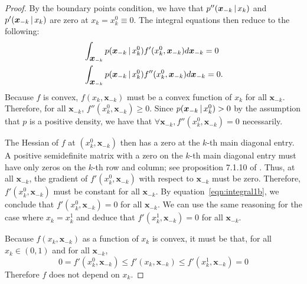 \begin{proof}
By the boundary points condition, we have that $p''(\mbox{\boldmath $x$}_{-k}
{\,|\,} x_k)$ and $p'(\mbox{\boldmath $x$}_{-k} {\,|\,} x_k)$ are zero at $x_k =
x_k^0 \equiv 0$. The integral equations then reduce to the following:
\begin{align}
& \int_{\mbox{\boldmath $x$}_{-k}} p(\mbox{\boldmath $x$}_{-k} {\,|\,} x^0_k) f'(x^0_k, \mbox{\boldmath $x$}_{-k}) d \mbox{\boldmath $x$}_{-k}= 0 \label{eqn:integral1b} \\
& \int_{\mbox{\boldmath $x$}_{-k}} p(\mbox{\boldmath $x$}_{-k} {\,|\,} x^0_k) f''(x^0_k, \mbox{\boldmath $x$}_{-k}) d\mbox{\boldmath $x$}_{-k} = 0.
\end{align}
Because $f$ is convex, $f(x_k, \mathbf{x}_{-k})$ must be a convex
function of 
$x_k$ for all $\mathbf{x}_{-k}$. Therefore, for all $\mathbf{x}_{-k}$,
$f''(x^0_k, \mathbf{x}_{-k}) \geq 0$. Since $p(\mbox{\boldmath $x$}_{-k} {\,|\,}
x^0_k) > 0$ by the assumption that $p$ is a positive density, 
we have that $\forall \mathbf{x}_{-k}, f''(x^0_k, \mathbf{x}_{-k}) = 0$ necessarily.

The Hessian of $f$ at $(x^0_k, \mathbf{x}_{-k})$ then has a zero at
the $k$-th main diagonal entry. A positive semidefinite matrix with a
zero on the $k$-th main diagonal entry must have only zeros on the
$k$-th row and column; see proposition 7.1.10 of
\citet{HJ90}.  Thus, at all $\mathbf{x}_{-k}$, the
gradient of $f'(x^0_k, \mathbf{x}_{-k})$ with respect to
$\mathbf{x}_{-k}$ must be zero.
Therefore, $f'(x_k^0, \mathbf{x}_{-k})$ must be constant for all
$\mathbf{x}_{-k}$. By equation~\ref{eqn:integral1b}, we conclude 
that $f'(x_k^0, \mathbf{x}_{-k}) = 0$ for all $\mathbf{x}_{-k}$. We
can use the same reasoning for the case where $x_k = x_k^1$ and deduce
that $f'(x^1_k, \mathbf{x}_{-k}) = 0$ for all $\mathbf{x}_{-k}$. 

Because $f(x_k, \mathbf{x}_{-k})$ as a function of $x_k$ is convex, it must be that, for all $x_k \in (0,1)$ and for all $\mathbf{x}_{-k}$,
\begin{equation}
0 = f'(x_k^0, \mathbf{x}_{-k}) \leq f'(x_k, \mathbf{x}_{-k}) \leq 
    f'(x_k^1, \mathbf{x}_{-k}) = 0
\end{equation}
Therefore $f$ does not depend on $x_k$.


\end{proof}

